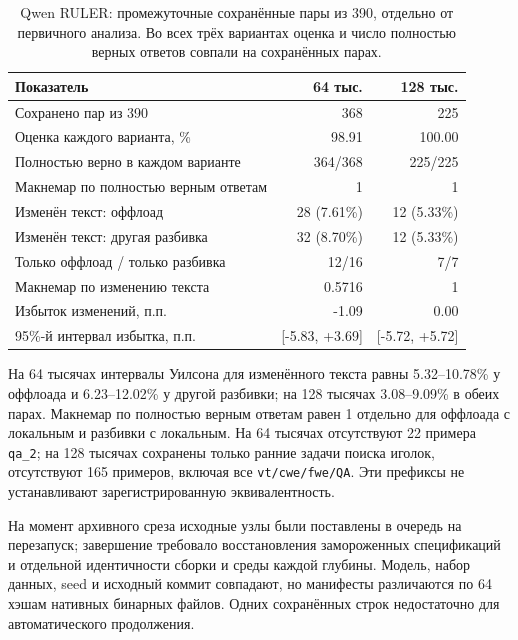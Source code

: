 \begin{table}[t]
\centering
\caption{Qwen RULER: промежуточные сохранённые пары из 390, отдельно от первичного анализа.
Во всех трёх вариантах оценка и число полностью верных ответов совпали на сохранённых парах.}
\label{tab:ruler-interim-archive}
\footnotesize
\begin{tabular}{lrr}
\toprule
Показатель & 64 тыс. & 128 тыс. \\
\midrule
Сохранено пар из 390 & 368 & 225 \\
Оценка каждого варианта, \% & 98.91 & 100.00 \\
Полностью верно в каждом варианте & 364/368 & 225/225 \\
Макнемар по полностью верным ответам & 1 & 1 \\
Изменён текст: оффлоад & 28 (7.61\%) & 12 (5.33\%) \\
Изменён текст: другая разбивка & 32 (8.70\%) & 12 (5.33\%) \\
Только оффлоад / только разбивка & 12/16 & 7/7 \\
Макнемар по изменению текста & 0.5716 & 1 \\
Избыток изменений, п.п. & -1.09 & 0.00 \\
95\%-й интервал избытка, п.п. & [-5.83, +3.69] & [-5.72, +5.72] \\
\bottomrule
\end{tabular}
\end{table}

На 64 тысячах интервалы Уилсона для изменённого текста равны 5.32--10.78\% у оффлоада
и 6.23--12.02\% у другой разбивки; на 128 тысячах 3.08--9.09\% в обеих парах.
Макнемар по полностью верным ответам равен 1 отдельно для оффлоада с локальным и разбивки с локальным.
На 64 тысячах отсутствуют 22 примера \texttt{qa\_2}; на 128 тысячах сохранены только ранние задачи поиска иголок,
отсутствуют 165 примеров, включая все \texttt{vt/cwe/fwe/QA}.
Эти префиксы не устанавливают зарегистрированную эквивалентность.

На момент архивного среза исходные узлы были поставлены в очередь на перезапуск; завершение требовало восстановления замороженных спецификаций
и отдельной идентичности сборки и среды каждой глубины. Модель, набор данных, seed и исходный коммит совпадают,
но манифесты различаются по 64 хэшам нативных бинарных файлов.
Одних сохранённых строк недостаточно для автоматического продолжения.

